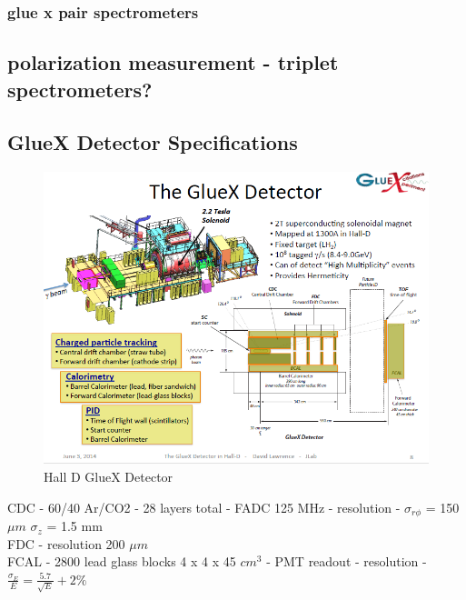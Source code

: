             \subsubsection{glue x pair spectrometers}
            \subsection{polarization measurement - triplet spectrometers?}
            
        \subsection{GlueX Detector Specifications}
            \begin{figure}[H]
                \centering
                \includegraphics[width=12cm]{CLAS-12/modules/jlab/Other_Halls/HallD/Hall_Design/GlueX_Detector.PNG}
                \caption{Hall D GlueX Detector}
            \end{figure}
            
            
            CDC -  60/40 Ar/CO2 - 28 layers total - FADC 125 MHz -  resolution - $\sigma_{r\phi}$ = 150 $\mu m$
            $\sigma_{z}$ = 1.5 mm\\
            FDC - resolution 200 $\mu m$\\
            FCAL - 2800 lead glass blocks 4 x 4 x 45 $cm^3$ - PMT readout - resolution - $\frac{\sigma_E}{E} = \frac{5.7}{\sqrt{E}} + 2\%$ 
            
